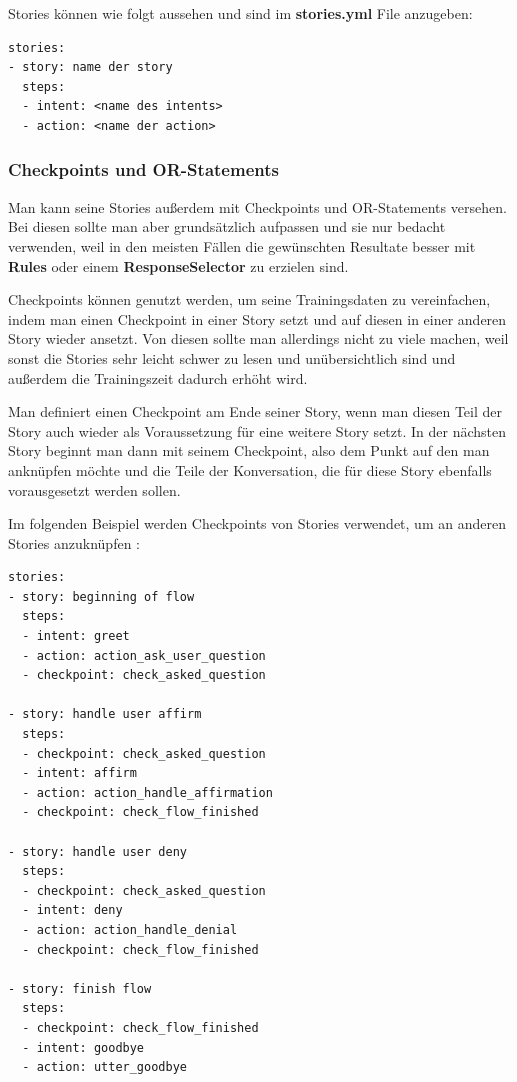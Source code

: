 Stories können wie folgt aussehen und sind im \textbf{stories.yml} File anzugeben:

\begin{lstlisting}[label={lst: Stories Example}]
stories:
- story: name der story
  steps:
  - intent: <name des intents>
  - action: <name der action>
\end{lstlisting}

\subsubsection{Checkpoints und OR-Statements}

Man kann seine Stories außerdem mit Checkpoints und OR-Statements versehen.
Bei diesen sollte man aber grundsätzlich aufpassen und sie nur bedacht verwenden, weil in den meisten Fällen die gewünschten Resultate besser mit \textbf{Rules} oder einem \textbf{ResponseSelector} zu erzielen sind.
\cite{checkpointsor}

Checkpoints können genutzt werden, um seine Trainingsdaten zu vereinfachen, indem man einen Checkpoint in einer Story setzt und auf diesen in einer anderen Story wieder ansetzt.
Von diesen sollte man allerdings nicht zu viele machen, weil sonst die Stories sehr leicht schwer zu lesen und unübersichtlich sind und außerdem die Trainingszeit dadurch erhöht wird.
\cite{checkpoints}

Man definiert einen Checkpoint am Ende seiner Story, wenn man diesen Teil der Story auch wieder als Voraussetzung für eine weitere Story setzt.
In der nächsten Story beginnt man dann mit seinem Checkpoint, also dem Punkt auf den man anknüpfen möchte und die Teile der Konversation, die für diese Story ebenfalls vorausgesetzt werden sollen.

Im folgenden Beispiel werden Checkpoints von Stories verwendet, um an anderen Stories anzuknüpfen\cite{checkpoints}
:

\begin{lstlisting}[label={lst: Checkpoints Example}]
stories:
- story: beginning of flow
  steps:
  - intent: greet
  - action: action_ask_user_question
  - checkpoint: check_asked_question

- story: handle user affirm
  steps:
  - checkpoint: check_asked_question
  - intent: affirm
  - action: action_handle_affirmation
  - checkpoint: check_flow_finished

- story: handle user deny
  steps:
  - checkpoint: check_asked_question
  - intent: deny
  - action: action_handle_denial
  - checkpoint: check_flow_finished

- story: finish flow
  steps:
  - checkpoint: check_flow_finished
  - intent: goodbye
  - action: utter_goodbye
\end{lstlisting}

